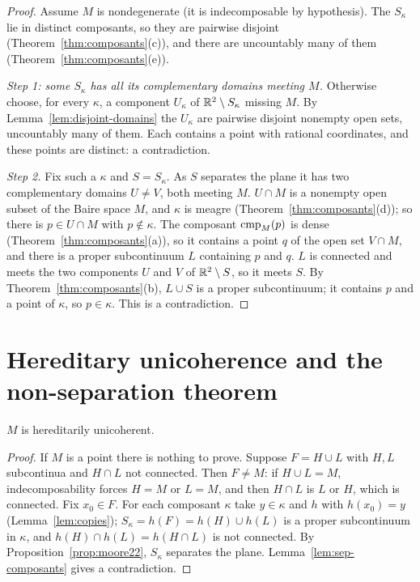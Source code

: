 \begin{proof}
Assume $M$ is nondegenerate (it is indecomposable by hypothesis). The $S_\kappa$ lie in distinct composants,
so they are pairwise disjoint (Theorem~\ref{thm:composants}(c)), and there are uncountably many of them
(Theorem~\ref{thm:composants}(e)).

\emph{Step 1: some $S_\kappa$ has all its complementary domains meeting $M$.} Otherwise choose, for every
$\kappa$, a component $U_\kappa$ of $\mathbb{R}^2\setminus S_\kappa$ missing $M$. By Lemma~\ref{lem:disjoint-domains}
the $U_\kappa$ are pairwise disjoint nonempty open sets, uncountably many of them. Each contains a point
with rational coordinates, and these points are distinct: a contradiction.

\emph{Step 2.} Fix such a $\kappa$ and $S=S_\kappa$. As $S$ separates the plane it has two complementary
domains $U\neq V$, both meeting $M$. $U\cap M$ is a nonempty open subset of the Baire space $M$, and $\kappa$
is meagre (Theorem~\ref{thm:composants}(d)); so there is $p\in U\cap M$ with $p\notin\kappa$. The composant
$\operatorname{cmp}_{M}(p)$ is dense (Theorem~\ref{thm:composants}(a)), so it contains a point $q$ of the open set $V\cap M$,
and there is a proper subcontinuum $L$ containing $p$ and $q$. $L$ is connected and meets the two
components $U$ and $V$ of $\mathbb{R}^2\setminus S$, so it meets $S$. By Theorem~\ref{thm:composants}(b), $L\cup S$ is
a proper subcontinuum; it contains $p$ and a point of $\kappa$, so $p\in\kappa$. This is a contradiction.
\end{proof}


\section{Hereditary unicoherence and the non-separation theorem}

\begin{theorem}\label{thm:hu}
$M$ is hereditarily unicoherent.
\end{theorem}

\begin{proof}
If $M$ is a point there is nothing to prove. Suppose $F=H\cup L$ with $H,L$ subcontinua and $H\cap L$ not
connected. Then $F\ne M$: if $H\cup L=M$, indecomposability forces $H=M$ or $L=M$, and then $H\cap L$ is
$L$ or $H$, which is connected. Fix $x_0\in F$. For each composant $\kappa$ take $y\in\kappa$ and $h$ with
$h(x_0)=y$ (Lemma~\ref{lem:copies}); $S_\kappa=h(F)=h(H)\cup h(L)$ is a proper subcontinuum in $\kappa$, and
$h(H)\cap h(L)=h(H\cap L)$ is not connected. By Proposition~\ref{prop:moore22}, $S_\kappa$ separates the
plane. Lemma~\ref{lem:sep-composants} gives a contradiction.
\end{proof}

